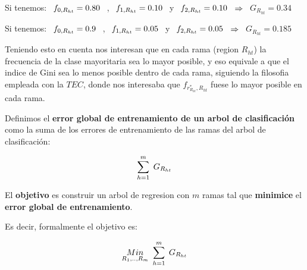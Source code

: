 \documentclass[
  11pt,
  a4paper,
]{article}
\begin{document}
Si tenemos: \(\hspace{0.15cm} f_{0 , R_{ht}} = 0.80 \hspace{0.15cm}\) ,
\(\hspace{0.15cm} f_{1 , R_{ht}}=0.10 \hspace{0.15cm}\) y
\(\hspace{0.15cm} f_{2 , R_{ht}}=0.10\)
\(\hspace{0.15cm} \Rightarrow \hspace{0.15cm}\) \(G_{R_{ht}} = 0.34\)

Si tenemos: \(\hspace{0.15cm} f_{0 , R_{ht}} = 0.9 \hspace{0.15cm}\) ,
\(\hspace{0.15cm} f_{1 , R_{ht}}=0.05 \hspace{0.15cm}\) y
\(\hspace{0.15cm} f_{2 , R_{ht}}=0.05\)
\(\hspace{0.15cm} \Rightarrow \hspace{0.15cm}\) \(G_{R_{ht}} = 0.185\)

\vspace{0.35cm}

Teniendo esto en cuenta nos interesan que en cada rama (region
\(R_{ht}\)) la frecuencia de la clase mayoritaria sea lo mayor posible,
y eso equivale a que el indice de Gini sea lo menos posible dentro de
cada rama, siguiendo la filosofia empleada con la \(TEC\), donde nos
interesaba que \(f_{r^*_{R_{ht}} , R_{ht}}\) fuese lo mayor posible en
cada rama.

\newpage

Definimos el \textbf{error global de entrenamiento de un arbol de
clasificación} como la suma de los errores de entrenamiento de las ramas
del arbol de clasificación:

\[\sum_{h=1}^{m} \hspace{0.1cm} G_{R_{ht}} \]

\vspace{0.35cm}

El \textbf{objetivo} es construir un arbol de regresion con \(m\) ramas
tal que \textbf{minimice} el \textbf{error global de entrenamiento}.

Es decir, formalmente el objetivo es:

\[ \underset{R_1,..,R_m}{Min}  \hspace{0.12cm}  \sum_{h=1}^{m} \hspace{0.1cm} G_{R_{ht}}  \]

\vspace{0.35cm}
\end{document}
